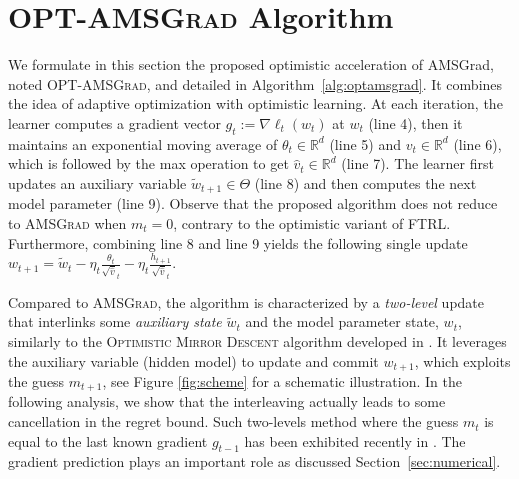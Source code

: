 \documentclass[11pt]{article}
\theoremstyle{k}
\begin{document}
\section{\textsc{OPT-AMSGrad} Algorithm}\label{sec:opt}
\vspace{-0.1in}
We formulate in this section the proposed optimistic acceleration of AMSGrad, noted \textsc{OPT-AMSGrad}, and detailed in Algorithm~\ref{alg:optamsgrad}.  
It combines the idea of adaptive optimization with optimistic learning. 
At each iteration, the learner computes a gradient vector $g_{t}:= \nabla \ell_t( w_t)$ at $w_{t}$ (line 4), then it maintains an exponential moving average of $\theta_{t} \in \mathbb R^{d}$ (line 5) and $v_{t} \in \mathbb R^{d}$ (line 6), which is followed by the max operation to get $\hat{v}_{t} \in \mathbb R^{d}$ (line 7). 
The learner first updates an auxiliary variable $\tilde{w}_{t+1} \in \Theta$ (line 8) and then computes the next model parameter (line 9).
Observe that the proposed algorithm does not reduce to \textsc{AMSGrad} when $m_{t}=0$, contrary to the optimistic variant of \textsc{FTRL}.
Furthermore, combining line 8 and line 9 yields the following single update $w_{t+1}= \tilde{w}_{t}  - \eta_t \frac{\theta_t}{ \sqrt{\hat{v}}_t } - \eta_{t} \frac{h_{t+1}}{ \sqrt{\hat{v}}_t }$. 

Compared to \textsc{AMSGrad}, the algorithm is characterized by a \emph{two-level} update that interlinks some \emph{auxiliary state} $\tilde{w}_{t}$ and the model parameter state, $w_t$, similarly to the \textsc{Optimistic Mirror Descent} algorithm developed in \citep{rakhlin2013online}.
It leverages the auxiliary variable (hidden model) to update and commit $w_{t+1}$, which exploits the guess $m_{t+1}$, see Figure \ref{fig:scheme} for a schematic illustration.
In the following analysis, we show that the interleaving actually leads to some cancellation in the regret bound.
Such two-levels method where the guess $m_t$ is equal to the last known gradient $g_{t-1}$ has been exhibited recently in \citep{CJ12}.
The gradient prediction plays an important role as discussed Section~\ref{sec:numerical}.
\end{document}
